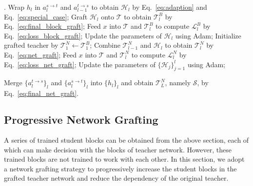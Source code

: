 \documentclass[letterpaper]{article} %
\begin{document}
{{    }

    {
        \setlength{\textfloatsep}{2pt}
        \renewcommand{\algorithmicrequire}{\textbf{Input:}}
        \renewcommand{\algorithmicensure}{\textbf{Output:}}
        \begin{algorithm}[!t]
            \caption{Network Grafting for Few-Shot Knowledge Distillation}
            \label{alg:A1}
            \begin{algorithmic}[1]
                .
                    \State Wrap $h_l$ in $a_l^{s \rightarrow t}$ and $a_{l-1}^{t \rightarrow s}$ to obtain $\mathcal{H}_l$ by Eq.~\ref{eq:adaption} and Eq.~\ref{eq:special_case};
                    \State Graft $\mathcal{H}_l$ onto $\mathcal{T}$ to obtain $\mathcal{T}_l^B$ by Eq.~\ref{eq:final_block_graft};
                        \State Feed $x$ into $\mathcal{T}$ and $\mathcal{T}_l^B$ to compute $\mathcal{L}_l^{B}$ by Eq.~\ref{eq:loss_block_graft};
                        \State Update the parameters of $\mathcal{H}_l$ using Adam;
                    \EndFor
                \EndFor
                \State Initialize grafted teacher by $\mathcal{T}_{1}^N \leftarrow \mathcal{T}_{1}^B$;
                    \State Combine $\mathcal{T}_{l-1}^N$ and $\mathcal{H}_l$ to obtain $\mathcal{T}_l^N$ by Eq.~\ref{eq:net_graft};
                        \State Feed $x$ into $\mathcal{T}$ and $\mathcal{T}_l^N$ to compute $\mathcal{L}_l^{N}$ by Eq.~\ref{eq:loss_net_graft};
                        \State Update the parameters of $\{ \mathcal{H}_j \}_{j=1}^l$ using Adam;
                    \EndFor
                \EndFor

                \State Merge $\{a_l^{t \rightarrow s}\}_l$ and $\{a_l^{s \rightarrow t}\}_l$ into $\{h_l\}_l$ and obtain $\mathcal{T}_L^{N}$, namely $\mathcal{S}$, by Eq.~\ref{eq:final_net_graft}.
            \end{algorithmic}
        \end{algorithm}
    }

    \subsection{Progressive Network Grafting}
    {
        A series of trained student blocks can be obtained from the above section, each of which can make decision with the blocks of teacher network.
        However, these trained blocks are not trained to work with each other.
        In this section, we adopt a network grafting strategy to progressively increase the student blocks in the grafted teacher network and reduce the dependency of the original teacher.

}}
\end{document}
